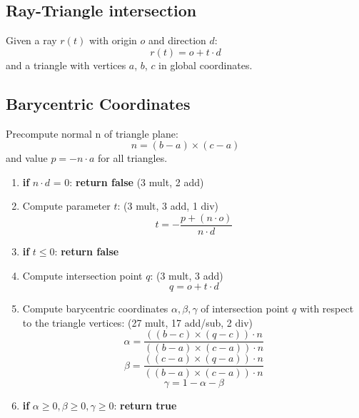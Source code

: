 \documentclass{article}
\begin{document}
\subsection*{Ray-Triangle intersection}
Given a ray $r(t)$ with origin $o$ and direction $d$:
\begin{equation*}
  r(t) = o + t \cdot d
\end{equation*}
and a triangle with vertices $a$, $b$, $c$ in global coordinates.
\subsection*{ Barycentric Coordinates }


Precompute normal n of triangle plane:
        \begin{equation*}
            n = (b-a) \times (c-a)
        \end{equation*}
    and value $p = - n \cdot a$ for all triangles.
\begin{enumerate}
    \item \textbf{if } $n \cdot d$ = 0: \textbf{return false } (3 mult, 2 add)
    \item Compute parameter $t$: (3 mult, 3 add, 1 div)
        \begin{equation*}
            t = -\frac{p + (n \cdot o)}{n \cdot d}
        \end{equation*}
    \item \textbf{if} $t \leq 0$: \textbf{return false }
    \item Compute intersection point $q$: (3 mult, 3 add)
        \begin{equation*}
            q = o + t \cdot d
        \end{equation*}
    \item Compute barycentric coordinates $\alpha, \beta, \gamma$ of intersection point $q$ with respect to the triangle vertices: (27 mult, 17 add/sub, 2 div)
        \begin{equation*}
                \alpha = \frac{((b-c) \times (q-c))\cdot n}{((b-a) \times (c-a)) \cdot n}
        \end{equation*}
        \begin{equation*}
                \beta = \frac{((c-a) \times (q-a))\cdot n}{((b-a) \times (c-a)) \cdot n}
        \end{equation*}
         \begin{equation*}
                \gamma = 1 - \alpha - \beta
        \end{equation*}
    \item \textbf{if }$\alpha \geq 0, \beta \geq 0, \gamma \geq 0$: \textbf{return true}
\end{enumerate}
\end{document}
